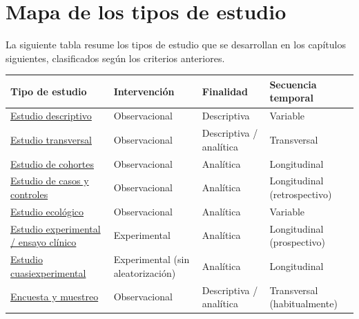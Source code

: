 \documentclass[
  spanish,
  a4paper,
]{scrreport}
\newcounter{none} %
\theoremstyle{definition}
\theoremstyle{definition}
\theoremstyle{remark}
\begin{document}
\section{Mapa de los tipos de
estudio}\label{mapa-de-los-tipos-de-estudio}

La siguiente tabla resume los tipos de estudio que se desarrollan en los
capítulos siguientes, clasificados según los criterios anteriores.

{\def\LTcaptype{none} %
\begin{longtable}[]{@{}
  >{\raggedright\arraybackslash}p{}
  >{\raggedright\arraybackslash}p{}
  >{\raggedright\arraybackslash}p{}
  >{\raggedright\arraybackslash}p{}@{}}
\toprule\noalign{}
\begin{minipage}[b]{\linewidth}\raggedright
Tipo de estudio
\end{minipage} & \begin{minipage}[b]{\linewidth}\raggedright
Intervención
\end{minipage} & \begin{minipage}[b]{\linewidth}\raggedright
Finalidad
\end{minipage} & \begin{minipage}[b]{\linewidth}\raggedright
Secuencia temporal
\end{minipage} \\
\midrule\noalign{}
\endhead
\bottomrule\noalign{}
\endlastfoot
\href{02-estudios-descriptivos.qmd}{Estudio descriptivo} & Observacional
& Descriptiva & Variable \\
\href{03-estudios-transversales.qmd}{Estudio transversal} &
Observacional & Descriptiva / analítica & Transversal \\
\href{04-estudios-cohortes.qmd}{Estudio de cohortes} & Observacional &
Analítica & Longitudinal \\
\href{05-estudios-casos-controles.qmd}{Estudio de casos y controles} &
Observacional & Analítica & Longitudinal (retrospectivo) \\
\href{06-estudios-ecologicos.qmd}{Estudio ecológico} & Observacional &
Analítica & Variable \\
\href{07-estudios-experimentales.qmd}{Estudio experimental / ensayo
clínico} & Experimental & Analítica & Longitudinal (prospectivo) \\
\href{08-estudios-cuasiexperimentales.qmd}{Estudio cuasiexperimental} &
Experimental (sin aleatorización) & Analítica & Longitudinal \\
\href{09-encuestas-muestreo.qmd}{Encuesta y muestreo} & Observacional &
Descriptiva / analítica & Transversal (habitualmente) \\
\end{longtable}
}
\end{document}
